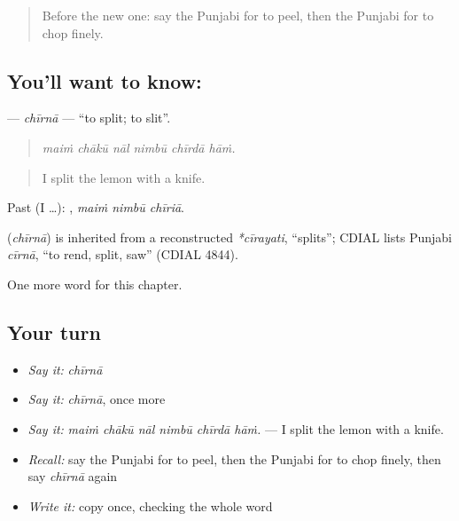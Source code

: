 \begin{quote}
Before the new one: say the Punjabi for to peel, then the Punjabi for to chop finely.
\end{quote}

\subsection*{You'll want to know: }
\textbf{} — \emph{chīrnā} — \textquotedblleft{}to split; to slit\textquotedblright{}.

\begin{quote}
     
\end{quote}

\begin{quote}
\emph{maiṁ chākū nāl nimbū chīrdā hāṁ.}
\end{quote}

\begin{quote}
I split the lemon with a knife.
\end{quote}

Past (I …):   , \emph{maiṁ nimbū chīriā}.

\begin{cousinweb}
\textbf{} (\emph{chīrnā}) is inherited from a reconstructed \emph{*cīrayati}, \textquotedblleft{}splits\textquotedblright{}; CDIAL lists Punjabi \emph{cīrnā}, \textquotedblleft{}to rend, split, saw\textquotedblright{} (CDIAL 4844).
\end{cousinweb}

\begin{grammarlens}[title={What you've built}]
One more word for this chapter.
\end{grammarlens}

\subsection*{Your turn}
\begin{itemize}
\raggedright
  \item \emph{Say it:} \emph{chīrnā}
  \item \emph{Say it:} \emph{chīrnā}, once more
  \item \emph{Say it:} \emph{maiṁ chākū nāl nimbū chīrdā hāṁ.} — I split the lemon with a knife.
  \item \emph{Recall:} say the Punjabi for to peel, then the Punjabi for to chop finely, then say \emph{chīrnā} again
  \item \emph{Write it:} copy \textbf{} once, checking the whole word
\end{itemize}

